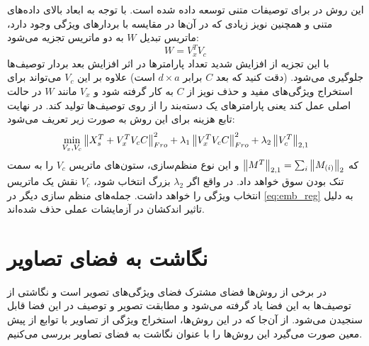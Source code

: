 این روش در
\cite{lessismore}
برای توصیفات متنی توسعه داده شده است. با توجه به ابعاد بالای داده‌های متنی و همچنین نویز زیادی که در آن‌ها در مقایسه با بردارهای ویژگی وجود دارد، ماتریس تبدیل $W$ به دو ماتریس تجزیه می‌شود:
\begin{equation}
W = V_x^T V_c
\end{equation}
با این تجزیه از افزایش شدید تعداد پارامترها در اثر افزایش بعد بردار توصیف‌ها جلوگیری می‌شود. (دقت کنید که بعد $C$ برابر $d\times a$ است) علاوه بر این $V_c$ می‌تواند برای استخراج ویژگی‌های مفید و حذف نویز از  $C$ به  کار گرفته شود و $V_x$ مانند $W$ در حالت اصلی عمل کند یعنی پارامترهای یک دسته‌بند را از روی توصیف‌ها تولید کند. در نهایت تابع هزینه برای این روش به صورت زیر تعریف می‌شود:
\begin{equation}
\min_{V_x, V_c} \left \lVert X_s^T + V_x^T V_c C \right \rVert_{Fro}^2 + \lambda_1 \left \lVert  V_x^T V_c C \right \rVert_{Fro}^2 +
\lambda_2 \left \lVert V_c^T \right \rVert_{2,1}
\end{equation}
که
$\left \lVert M^T \right \rVert_{2,1} = \sum_i \left \lVert M_{(i)} \right \rVert_2 $
و این نوع منظم‌سازی، ستون‌های ماتریس $V_c$ را به سمت تنک بودن سوق خواهد داد. در واقع اگر $\lambda_2$ بزرگ انتخاب شود، $V_c$ نقش یک ماتریس انتخاب ویژگی
را خواهد داشت. جمله‌های منظم سازی دیگر در
\eqref{eq:emb_reg}
به دلیل تاثیر اندکشان در آزمایشات عملی حذف شده‌اند.


\section{نگاشت به فضای تصاویر}\label{to_images}
در برخی از روش‌ها فضای مشترک فضای ویژگی‌های تصویر است و نگاشتی از توصیف‌ها به این فضا یاد گرفته می‌شود و مطابقت تصویر و توصیف در این فضا قابل سنجیدن می‌شود. از آن‌جا که در این روش‌‌ها، استخراج ویژگی از تصاویر با توابع از پیش معین صورت می‌گیرد این روش‌ها را با عنوان نگاشت به فضای تصاویر بررسی می‌کنیم.


